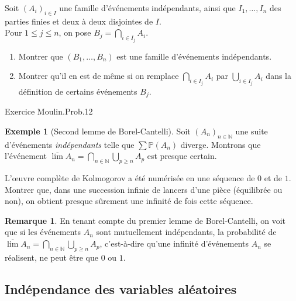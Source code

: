 \documentclass[french]{article}
\renewcommand{\P}{\mathbb{P}}
\newcommand{\N}{\mathbb{N}}
\theoremstyle{plain}
\theoremstyle{definition}
\newtheorem*{ex}{Exemple}
\newtheorem*{rmq}{Remarque}
\theoremstyle{remark}
\begin{document}
\begin{exo}
	Soit $(A_i)_{i\in I}$ une famille d'événements indépendants, ainsi que $I_1,\ldots,I_n$ des parties finies et deux à deux disjointes de $I$. \\
	Pour $1\leqslant j\leqslant n$, on pose $B_j=\displaystyle\bigcap_{i\in I_j}A_i$.
	\begin{enumerate}
		\item Montrer que $(B_1,\ldots,B_n)$ est une famille d'événements indépendants.
		\item Montrer qu'il en est de même si on remplace $\displaystyle\bigcap_{i\in I_j}A_i$ par $\displaystyle\bigcup_{i\in I_j}A_i$ dans la définition de certains événements $B_j$.
	\end{enumerate}
\end{exo}

Exercice Moulin.Prob.12

\begin{ex}[Second lemme de Borel-Cantelli]
	Soit $(A_n)_{n\in\N}$ une suite d'événements \textit{indépendants} telle que $\displaystyle\sum\P(A_n)$ diverge. Montrons que l'événement $\overline{\lim}A_n=\displaystyle\bigcap_{n\in\N}\bigcup_{p\geqslant n}A_p$ est presque certain.
\end{ex}

\begin{exo}
	L'œuvre complète de Kolmogorov a été  numérisée en une séquence de $0$ et de $1$. Montrer que, dans une succession infinie de lancers d'une pièce (équilibrée ou non), on obtient presque sûrement une infinité de fois cette séquence.
\end{exo}

\begin{rmq}
	En tenant compte du premier lemme de Borel-Cantelli, on voit que si les événements $A_n$ sont mutuellement indépendants, la probabilité de $\overline{\lim}A_n=\displaystyle\bigcap_{n\in\N}\bigcup_{p\geqslant n}A_p$, c'est-à-dire qu'une infinité d'événements $A_n$ se réalisent, ne peut être que $0$ ou $1$.
\end{rmq}

\subsection{Indépendance des variables aléatoires}
\end{document}
